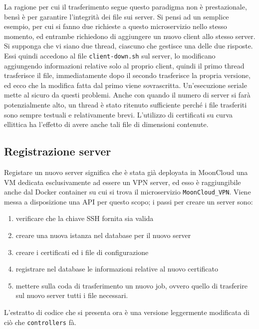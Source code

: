La ragione per cui il trasferimento segue questo paradigma non è prestazionale, bensì è per
garantire l'integrità dei file sui server.
Si pensi ad un semplice esempio, per cui si fanno due richieste a questo microservizio nello stesso
momento, ed entrambe richiedono di aggiungere un nuovo client allo stesso server.
Si supponga che vi siano due thread, ciascuno che gestisce una delle due risposte. Essi quindi
accedono al file \texttt{client-down.sh} sul server, lo modificano aggiungendo informazioni
relative solo al proprio client, quindi il primo thread trasferisce il file, immediatamente dopo
il secondo trasferisce la propria versione, ed ecco che la modifica fatta dal primo viene
sovrascritta.
Un'esecuzione seriale mette al sicuro da questi problemi. Anche con quando il numero di server
si farà potenzialmente alto, un thread è stato ritenuto sufficiente perché i file trasferiti
sono sempre testuali e relativamente brevi. L'utilizzo di certificati su curva ellittica
ha l'effetto di avere anche tali file di dimensioni contenute.


\subsection{Registrazione server}
Registare un nuovo server significa che è stata già deployata in MoonCloud una VM dedicata
esclusivamente ad essere un VPN server, ed esso è raggiungibile anche dal Docker container su
cui si trova il microservizio \texttt{MoonCloud\_VPN}.
Viene messa a disposizione una API per questo scopo; i passi per creare un server sono:
\begin{enumerate}
    \item verificare che la chiave SSH fornita sia valida
    \item creare una nuova istanza nel database per il nuovo server
    \item creare i certificati ed i file di configurazione
    \item registrare nel database le informazioni relative al nuovo certificato
    \item mettere sulla coda di trasferimento un nuovo job, ovvero quello di
    trasferire sul nuovo server tutti i file necessari.
\end{enumerate}
L'estratto di codice che si presenta ora è una versione leggermente modificata di ciò che
\texttt{controllers} fà.
\inputminted[tabsize=4, breaklines]{python}{code_samples/controllers_create_server.py}